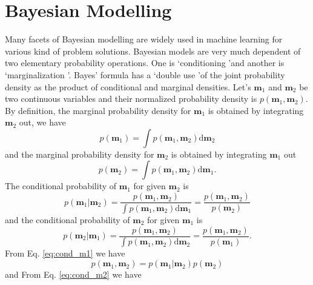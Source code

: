 \section{Bayesian Modelling}\label{sec:Bayesian_model}
Many facets of Bayesian modelling are widely used in machine learning for various kind of problem solutions. Bayesian models are very much dependent of two elementary probability operations. One is \lq conditioning \rq and another is \lq marginalization \rq. Bayes' formula has a \lq double use \rq of the joint probability density as the product of conditional and marginal densities. Let's $\textbf{m}_1$ and $\textbf{m}_2$ be two continuous variables and their normalized probability density is $p\left(\textbf{m}_1,\textbf{m}_2\right)$. By definition, the marginal probability density for $\textbf{m}_1$ is obtained by integrating $\textbf{m}_2$ out, we have
\begin{equation}\label{eq:marginal_m1}
 p\left(\textbf{m}_1\right) =\int p\left(\textbf{m}_1,\textbf{m}_2\right) \text{d}\textbf{m}_2
\end{equation}
and the marginal probability density for $\textbf{m}_2$ is obtained by integrating $\textbf{m}_1$ out
\begin{equation}\label{eq:marginal_m2}
 p\left(\textbf{m}_2\right) =\int p\left(\textbf{m}_1,\textbf{m}_2\right) \text{d}\textbf{m}_1.
\end{equation}
The conditional probability of $\textbf{m}_1$ for given $\textbf{m}_2$ is
\begin{equation}\label{eq:cond_m1}
 p\left(\textbf{m}_1|\textbf{m}_2\right) =\frac{p\left(\textbf{m}_1,\textbf{m}_2\right)}{\int p\left(\textbf{m}_1,\textbf{m}_2\right) \text{d}\textbf{m}_1} = \frac{p\left(\textbf{m}_1,\textbf{m}_2\right)}{p\left(\textbf{m}_2\right)}
\end{equation}
and the conditional probability of $\textbf{m}_2$ for given $\textbf{m}_1$ is
\begin{equation}\label{eq:cond_m2}
 p\left(\textbf{m}_2|\textbf{m}_1\right) =\frac{p\left(\textbf{m}_1,\textbf{m}_2\right)}{\int p\left(\textbf{m}_1,\textbf{m}_2\right) \text{d}\textbf{m}_2} = \frac{p\left(\textbf{m}_1,\textbf{m}_2\right)}{p\left(\textbf{m}_1\right)}.
\end{equation}
From Eq. \ref{eq:cond_m1} we have
\begin{equation}\label{eq:cond_m2m1}
 p\left(\textbf{m}_1,\textbf{m}_2\right) = p\left(\textbf{m}_1|\textbf{m}_2\right)p\left(\textbf{m}_2\right)
\end{equation}
and From Eq. \ref{eq:cond_m2} we have
